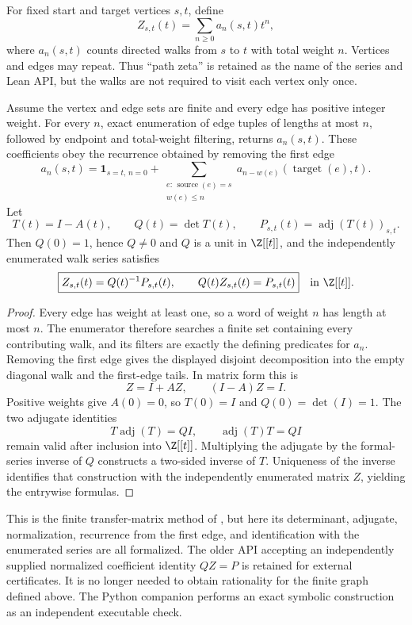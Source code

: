 For fixed start and target vertices $s,t$, define
\[
Z_{s,t}(t)
=
\sum_{n\ge0}a_n(s,t)t^n,
\]
where $a_n(s,t)$ counts directed walks from $s$ to $t$ with total weight $n$.
Vertices and edges may repeat. Thus ``path zeta'' is retained as the name of
the series and Lean API, but the walks are not required to visit each vertex only once.

\begin{theorem}\label{thm:transfer-zeta}
Assume the vertex and edge sets are finite and every edge has positive integer
weight. For every $n$, exact enumeration of edge tuples of lengths at most
$n$, followed by endpoint and total-weight filtering, returns $a_n(s,t)$.
These coefficients obey the recurrence obtained by removing the first edge
\[
a_n(s,t)
=
\mathbf 1_{s=t,\,n=0}
+\sum_{\substack{e:\,\operatorname{source}(e)=s\\w(e)\le n}}
a_{n-w(e)}(\operatorname{target}(e),t).
\]
Let
\[
T(t)=I-A(t),\qquad
Q(t)=\det T(t),\qquad
P_{s,t}(t)=\operatorname{adj}(T(t))_{s,t}.
\]
Then $Q(0)=1$, hence $Q\ne0$ and $Q$ is a unit in $\Z[[t]]$, and the
independently enumerated walk series satisfies
\[
\boxed{
Z_{s,t}(t)=Q(t)^{-1}P_{s,t}(t),
\qquad
Q(t)Z_{s,t}(t)=P_{s,t}(t)
}
\quad\text{in }\Z[[t]].
\]
\end{theorem}

\begin{proof}
Every edge has weight at least one, so a word of weight $n$ has length at
most $n$. The enumerator therefore searches a finite set containing every
contributing walk, and its filters are exactly the defining predicates for
$a_n$. Removing the first edge gives the displayed disjoint decomposition
into the empty diagonal walk and the first-edge tails. In matrix form this is
\[
Z=I+AZ,
\qquad (I-A)Z=I.
\]
Positive weights give $A(0)=0$, so $T(0)=I$ and
$Q(0)=\det(I)=1$. The two adjugate identities
\[
T\operatorname{adj}(T)=Q I,
\qquad
\operatorname{adj}(T)T=Q I
\]
remain valid after inclusion into $\Z[[t]]$. Multiplying the adjugate by the
formal-series inverse of $Q$ constructs a two-sided inverse of $T$.
Uniqueness of the inverse identifies that construction with the independently
enumerated matrix $Z$, yielding the entrywise formulas.
\end{proof}

This is the finite transfer-matrix method of \cite{Stanley2012}, but here its
determinant, adjugate, normalization, recurrence from the first edge, and identification
with the enumerated series are all formalized. The older API accepting an
independently supplied normalized coefficient identity $QZ=P$ is retained for
external certificates. It is no longer needed to obtain rationality for the
finite graph defined above. The Python companion performs an exact symbolic
construction as an independent executable check.

